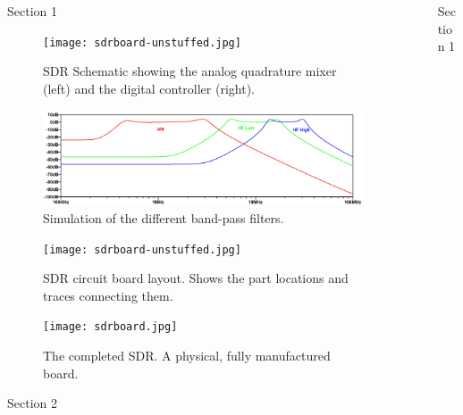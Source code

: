 \documentclass[final]{beamer}
\newlength{\sepwidth}
\newlength{\colwidth}
\newcommand{\separatorcolumn}{\begin{column}{\sepwidth}\end{column}}
\begin{document}
\begin{frame}[t]
\begin{columns}[t]
\begin{column}{\colwidth}
  \begin{block}{Section 1}
    
    \begin{figure}
      \centering
      \texttt{[image: sdrboard-unstuffed.jpg]}
      \caption{SDR Schematic showing the analog quadrature mixer (left) and the digital controller (right).}
    \end{figure}

    \begin{figure}
      \centering
      \includegraphics[scale=0.5]{bpfresponse.png}
      \caption{Simulation of the different band-pass filters.}
    \end{figure}

    \begin{figure}
      \centering
      \texttt{[image: sdrboard-unstuffed.jpg]}
      \caption{SDR circuit board layout. Shows the part locations and traces connecting them.}
    \end{figure}

    \begin{figure}
      \centering
      \texttt{[image: sdrboard.jpg]}
      \caption{The completed SDR. A physical, fully manufactured board.}
    \end{figure}

  \end{block}

  \begin{block}{Section 2}


  \end{block}


\end{column}

\separatorcolumn

\begin{column}{\colwidth}

  \begin{block}{Section 1}


\end{block}
\end{column}
\end{columns}
\end{frame}
\end{document}
